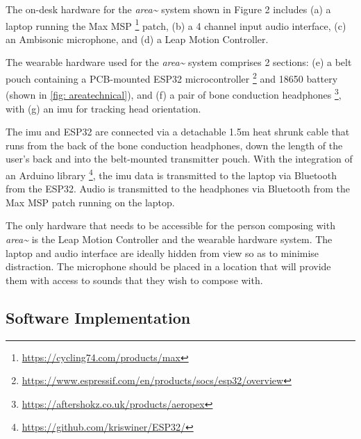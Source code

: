 The on-desk hardware for the \textit{area\textasciitilde{}} system shown in Figure 2 includes (a) a laptop running the Max MSP \footnote{\url{https://cycling74.com/products/max}} patch, (b) a 4 channel input audio interface, (c) an Ambisonic microphone, and (d) a Leap Motion Controller.

The wearable hardware used for the \textit{area\textasciitilde{}} system comprises 2 sections: (e) a belt pouch containing a PCB-mounted ESP32 microcontroller \footnote{\url{https://www.espressif.com/en/products/socs/esp32/overview}} and 18650 battery (shown in \autoref{fig: areatechnical}), and (f) a pair of bone conduction headphones \footnote{\url{https://aftershokz.co.uk/products/aeropex}}, with (g) an \gls{imu} for tracking head orientation. 

The \gls{imu} and ESP32 are connected via a detachable 1.5m heat shrunk cable that runs from the back of the bone conduction headphones, down the length of the user's back and into the belt-mounted transmitter pouch. With the integration of an Arduino library \footnote{\url{https://github.com/kriswiner/ESP32/}}, the \gls{imu} data is transmitted to the laptop via Bluetooth from the ESP32. Audio is transmitted to the headphones via Bluetooth from the Max MSP patch running on the laptop. 

The only hardware that needs to be accessible for the person composing with \textit{area\textasciitilde{}} is the Leap Motion Controller and the wearable hardware system. The laptop and audio interface are ideally hidden from view so as to minimise distraction. The microphone should be placed in a location that will provide them with access to sounds that they wish to compose with.

\subsection{Software Implementation}\label{sec: area-system-software}


